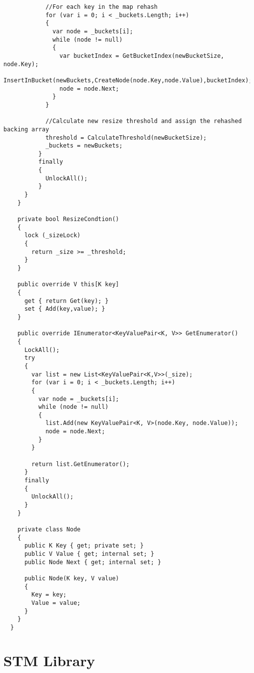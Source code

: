 \begin{lstlisting}
            //For each key in the map rehash
            for (var i = 0; i < _buckets.Length; i++)
            {
              var node = _buckets[i];
              while (node != null)
              {
                var bucketIndex = GetBucketIndex(newBucketSize, node.Key);
                InsertInBucket(newBuckets,CreateNode(node.Key,node.Value),bucketIndex);
                node = node.Next;
              }
            }

            //Calculate new resize threshold and assign the rehashed backing array
            threshold = CalculateThreshold(newBucketSize);
            _buckets = newBuckets;
          }
          finally
          {
            UnlockAll();
          }
      }
    }

    private bool ResizeCondtion()
    {
      lock (_sizeLock)
      {
        return _size >= _threshold;
      }
    }

    public override V this[K key]
    {
      get { return Get(key); }
      set { Add(key,value); }
    }

    public override IEnumerator<KeyValuePair<K, V>> GetEnumerator()
    {
      LockAll();
      try
      {
        var list = new List<KeyValuePair<K,V>>(_size);
        for (var i = 0; i < _buckets.Length; i++)
        {
          var node = _buckets[i];
          while (node != null)
          {
            list.Add(new KeyValuePair<K, V>(node.Key, node.Value));
            node = node.Next;
          }
        }

        return list.GetEnumerator();
      }
      finally
      {
        UnlockAll();
      }
    }

    private class Node
    {
      public K Key { get; private set; }
      public V Value { get; internal set; }
      public Node Next { get; internal set; }

      public Node(K key, V value)
      {
        Key = key;
        Value = value;
      }
    }
  }
\end{lstlisting}
\section{STM Library}\label{app:impl_stm_lib}
